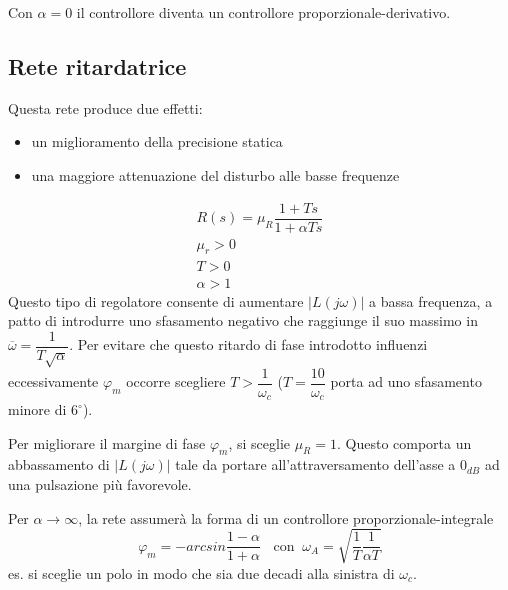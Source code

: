 \documentclass[a4paper]{report}
\begin{document}
Con $\alpha = 0$ il controllore diventa un controllore
proporzionale-derivativo.
\subsection{Rete ritardatrice}
Questa rete produce due effetti:
\begin{itemize}
\item un miglioramento della precisione statica
\item una maggiore attenuazione del disturbo alle basse frequenze
\end{itemize}
\begin{equation}
  \begin{array}{l}
    R(s) = \mu_R \dfrac{1 + Ts}{1 + \alpha Ts}\\
    \mu_r > 0\\
    T > 0\\
    \alpha > 1
  \end{array}
\end{equation}
Questo tipo di regolatore consente di aumentare $|L(j \omega)|$ a
bassa frequenza, a patto di introdurre uno sfasamento negativo che
raggiunge il suo massimo in $\overline{\omega} =
\dfrac{1}{T\sqrt{\alpha}}$. Per evitare che questo ritardo di fase
introdotto influenzi eccessivamente $\varphi_m$ occorre scegliere $T >
\dfrac{1}{\omega_c}$ ($T = \dfrac{10}{\omega_c}$ porta ad uno
sfasamento minore di $6^{\circ}$).

Per migliorare il margine di fase $\varphi_m$, si sceglie $\mu_R =
1$. Questo comporta un abbassamento di $|L(j \omega)|$ tale da portare
all'attraversamento dell'asse a $0_{dB}$ ad una pulsazione pi\`u
favorevole.

Per $\alpha \to \infty$, la rete assumer\`a la forma di un controllore
proporzionale-integrale
\[
\varphi_m = - arcsin \dfrac{1 - \alpha}{1 + \alpha} \;\;\textrm{ con
}\;\; \omega_A = \sqrt{\dfrac{1}{T}\dfrac{1}{\alpha T}}
\]
es. si sceglie un polo in modo che sia due decadi alla sinistra di
$\omega_c$.
\end{document}
